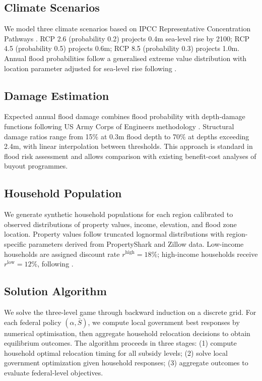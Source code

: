 \documentclass[12pt,a4paper]{article}
\begin{document}
\subsection{Climate Scenarios}

We model three climate scenarios based on IPCC Representative Concentration Pathways \citep{ipcc2019srocc}. RCP 2.6 (probability 0.2) projects 0.4m sea-level rise by 2100; RCP 4.5 (probability 0.5) projects 0.6m; RCP 8.5 (probability 0.3) projects 1.0m. Annual flood probabilities follow a generalised extreme value distribution with location parameter adjusted for sea-level rise following \citet{buchanan2016allowances}.

\subsection{Damage Estimation}

Expected annual flood damage combines flood probability with depth-damage functions following US Army Corps of Engineers methodology \citep{usace1992depth}. Structural damage ratios range from 15\% at 0.3m flood depth to 70\% at depths exceeding 2.4m, with linear interpolation between thresholds. This approach is standard in flood risk assessment \citep{wing2018estimates} and allows comparison with existing benefit-cost analyses of buyout programmes.

\subsection{Household Population}

We generate synthetic household populations for each region calibrated to observed distributions of property values, income, elevation, and flood zone location. Property values follow truncated lognormal distributions with region-specific parameters derived from PropertyShark and Zillow data. Low-income households are assigned discount rate $r^{\text{high}} = 18\%$; high-income households receive $r^{\text{low}} = 12\%$, following \citet{warner2001personal}.

\subsection{Solution Algorithm}

We solve the three-level game through backward induction on a discrete grid. For each federal policy $(\alpha, \bar{S})$, we compute local government best responses by numerical optimisation, then aggregate household relocation decisions to obtain equilibrium outcomes. The algorithm proceeds in three stages: (1) compute household optimal relocation timing for all subsidy levels; (2) solve local government optimization given household responses; (3) aggregate outcomes to evaluate federal-level objectives.
\end{document}
